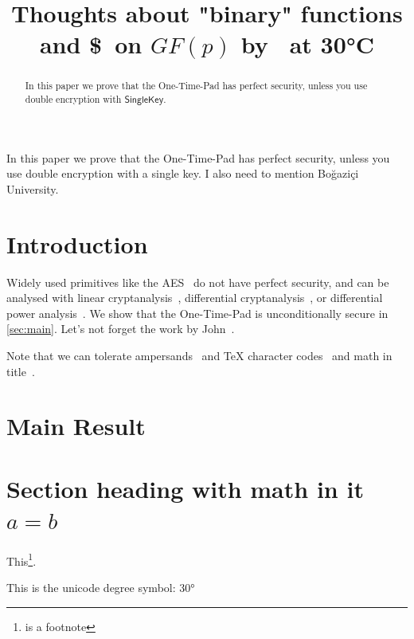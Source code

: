\documentclass{article}
\title[running={Thoughts on binary functions},
  plaintext={Thoughts about "binary" functions and \$\ on $GF(p)$ by Fester Bestertester at 30°C}]{%
  Thoughts about "binary" functions and \$\ on $GF(p)$ by \niceguy\ at 30°C}
\begin{document}
\maketitle

\begin{abstract}
  In this paper we prove that the One-Time-Pad has perfect security, unless you use
  double encryption with {$\mathsf{SingleKey}$}.
\lipsum[8]
\end{abstract}
\begin{textabstract}
  In this paper we prove that the One-Time-Pad has perfect security, unless you use
  double encryption with a single key. I also need to mention
  Bo{\u g}azi{\c c}i University.
\end{textabstract}

\section{Introduction}

Widely used primitives like the AES~\cite{AES} do not have perfect
security, and can be analysed with linear
cryptanalysis~\cite{EC:Matsui93}, differential
cryptanalysis~\cite{JC:BihSha91}, or differential power
analysis~\cite{C:KocJafJun99}.  We show that the One-Time-Pad is
unconditionally secure in \autoref{sec:main}. Let's not forget
the work by John~\cite{vonNeumann}.

Note that we can tolerate ampersands~\cite{Dalheimer02} and \TeX
character codes~\cite{Bohme10} and math in
title~\cite{ACISP:MurPla19,ACISP:LYLF19,ACISP:WeiSteSha03,CCS:BHKNRS19,ACNS:DurHugVau20}.

\lipsum[9]

\section{Main Result}\label{sec:main}

\lipsum

\section{Section heading with math in it $a=b$}
\lipsum

This\footnote{is a footnote}.

This is the unicode degree symbol: 30°
\ExplSyntaxOn

\ExplSyntaxOff


\end{document}
